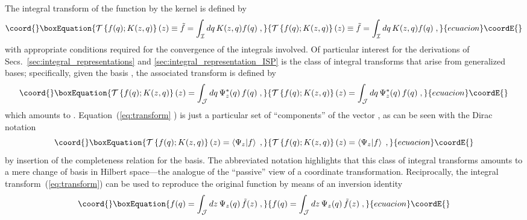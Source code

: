 \documentclass[a4paper,preprint,draft,showpacs,amsmath,amsfonts,amssymb,aps,prd]{revtex4}%
\begin{document}
The integral  transform
of the function \coordHE{} by the kernel
\coordHE{} is defined by
\begin{equation}\coord{}\boxEquation{
{\mathcal T} 
\left\{
f(q); K(z,q)
\right\} (z)
\equiv 
\tilde{f}
=
\int_{\mathcal I} 
dq 
\,
K(z,q) f(q)
\;  ,
}{
{\mathcal T} 
\left\{
f(q); K(z,q)
\right\} (z)
\equiv 
\tilde{f}
=
\int_{\mathcal I} 
dq 
\,
K(z,q) f(q)
\;  ,
}{ecuacion}\coordE{}\end{equation}
 with appropriate 
conditions required for the convergence of the integrals
involved. 
Of particular interest for the derivations of Secs.~\ref{sec:integral_representations} and 
\ref{sec:integral_representation_ISP}
is the class of integral transforms
that arise from generalized bases;
specifically,
given the basis
\coordHE{},
the associated transform is defined by  
\begin{equation}\coord{}\boxEquation{
{\mathcal T} 
\left\{
f(q); K(z,q)
\right\} (z)
=
\int_{\mathcal J}
dq \,
\Psi_{z}^{*} (q) \,
f(q)
\;  ,
\label{eq:transform}  
}{
{\mathcal T} 
\left\{
f(q); K(z,q)
\right\} (z)
=
\int_{\mathcal J}
dq \,
\Psi_{z}^{*} (q) \,
f(q)
\;  ,
}{ecuacion}\coordE{}\end{equation}
which amounts to
\coordHE{}.
Equation~(\ref{eq:transform} ) 
is just a particular set of ``components'' of the vector
\coordHE{}, as can be seen with the Dirac 
notation
\begin{equation}\coord{}\boxEquation{
{\mathcal T} 
\left\{
f(q); K(z,q)
\right\} (z)
=
\left\langle \Psi_{z} | f \right\rangle 
\;   ,
\label{eq:generalized_transform}
}{
{\mathcal T} 
\left\{
f(q); K(z,q)
\right\} (z)
=
\left\langle \Psi_{z} | f \right\rangle 
\;   ,
}{ecuacion}\coordE{}\end{equation}
by insertion of the completeness relation for the \coordHE{} basis.
The 
abbreviated notation \coordHE{} 
highlights that this class of integral transforms amounts to a mere change of basis in Hilbert
space---the analogue of the ``passive'' view of a coordinate transformation.
Reciprocally,
the integral transform~(\ref{eq:transform}) can be used to reproduce 
the original function by means of an inversion identity
\begin{equation}\coord{}\boxEquation{
f(q) =
\int_{\mathcal J}
 dz 
\,
\Psi_{z} (q)
 \,
\tilde{f}(z)
\;  ,
\label{eq:generalized_reciprocal_transform}
}{
f(q) =
\int_{\mathcal J}
 dz 
\,
\Psi_{z} (q)
 \,
\tilde{f}(z)
\;  ,
}{ecuacion}\coordE{}\end{equation}
\end{document}
